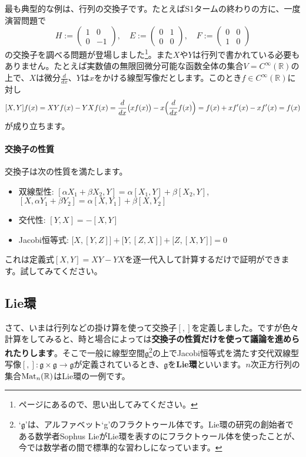 最も典型的な例は、行列の交換子です。たとえばS1タームの終わりの方に、一度演習問題で
\[
H := 
\begin{pmatrix}
1 & 0 \\
0 & -1
\end{pmatrix}, \quad
E := 
\begin{pmatrix}
0 & 1 \\
0 & 0
\end{pmatrix}, \quad
F := 
\begin{pmatrix}
0 & 0 \\
1 & 0
\end{pmatrix}
\]
の交換子を調べる問題が登場しました\footnote{\pageref{paragraph:commutator}ページにあるので、思い出してみてください。}。また$X$や$Y$は行列で書かれている必要もありません。たとえば実数値の無限回微分可能な函数全体の集合$V = C^{\infty}(\mathbb{R})$の上で、$X$は微分$\frac{d}{dx}$、$Y$は$x$をかける線型写像だとします。このとき$f \in C^{\infty}(\mathbb{R})$に対し
\[
[X, Y]f(x) = XY f(x) - YX f(x) = \frac{d}{dx} \bigl(x f(x)\bigr) - x\Bigl(\frac{d}{dx} f(x)\Bigr) = f(x) + x f'(x) - x f'(x) =  f(x)
\]
が成り立ちます。

\paragraph{交換子の性質}

交換子は次の性質を満たします。
\begin{itemize}
\item 双線型性: $[\alpha X_1 + \beta X_2, Y] = \alpha[X_1, Y] + \beta[X_2, Y]$, $[X, \alpha Y_1 + \beta Y_2] = \alpha [X, Y_1] + \beta [X, Y_2]$
\item 交代性: $[Y, X] = -[X, Y]$
\item Jacobi恒等式: $\bigl[X, [Y, Z]\bigr] + \bigl[Y, [Z, X]\bigr] + \bigl[Z, [X, Y]\bigr] = 0$
\end{itemize}
これは定義式$[X, Y] = XY - YX$を逐一代入して計算するだけで証明ができます。試してみてください。

\subsection{Lie環}

さて、いまは行列などの掛け算を使って交換子$[, ]$を定義しました。ですが色々計算をしてみると、時と場合によっては\textbf{交換子の性質だけを使って議論を進められたりします}。そこで一般に線型空間$\mathfrak{g}$\footnote{`$\mathfrak{g}$'は、アルファベット`g'のフラクトゥール体です。Lie環の研究の創始者である数学者Sophus LieがLie環を表すのにフラクトゥール体を使ったことが、今では数学者の間で標準的な習わしになっています。}の上でJacobi恒等式を満たす交代双線型写像$[, ]\colon \mathfrak{g}\times\mathfrak{g}\rightarrow\mathfrak{g}$が定義されているとき、$\mathfrak{g}$を\textbf{Lie環}といいます。$n$次正方行列の集合$\operatorname{Mat}_n(\mathbb{R})$はLie環の一例です。

